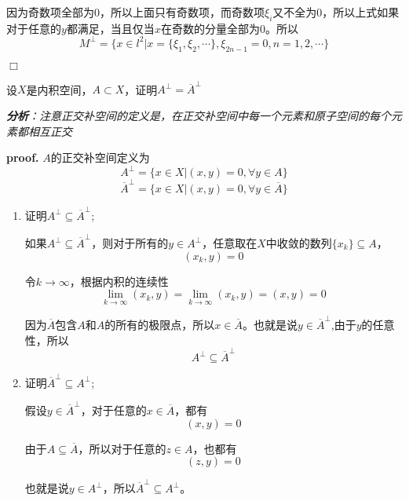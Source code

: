 因为奇数项全部为$0$，所以上面只有奇数项，而奇数项$\xi_i$又不全为$0$，所以上式如果对于任意的$y$都满足，当且仅当$x$在奇数的分量全部为$0$。所以
\begin{equation}
    M^\perp =\{x\in l^2|x=\{\xi_1,\xi_2,\cdots\},\xi_{2n-1}=0,n=1,2,\cdots\}
\end{equation}

$\Box$

\begin{mdframed}
    \begin{question}
        设$X$是内积空间，$A\subset X$，证明$A^\perp=\overline{A}^\perp$
    \end{question}
\end{mdframed}

\textsl{\textbf{分析}：注意正交补空间的定义是，在正交补空间中每一个元素和原子空间的每个元素都相互正交}

\textbf{proof.} $A$的正交补空间定义为
\begin{equation}
    A^\perp=\{x\in X|(x,y)=0,\forall y\in A\}
\end{equation}
\begin{equation}
    \overline{A}^\perp=\{x\in X|(x,y)=0,\forall y\in \overline{A}\}
\end{equation}

\begin{enumerate}[itemindent=2em]
    \item 证明$A^\perp \subseteq \overline{A}^\perp$;

    如果$A^\perp \subseteq \overline{A}^\perp$，则对于所有的$y\in A^\perp$，任意取在$X$中收敛的数列$\{x_k\}\subseteq A$，
    \begin{equation}
        (x_k,y)=0
    \end{equation}

    令$k\rightarrow \infty$，根据内积的连续性
    \begin{equation}
        \lim_{k\rightarrow \infty}(x_k,y)=\lim_{k\rightarrow \infty}(x_k,y)=(x,y)=0
    \end{equation}

    因为$\overline{A}$包含$A$和$A$的所有的极限点，所以$x\in \overline{A}$。也就是说$y\in \overline{A}^\perp$,由于$y$的任意性，所以
    \begin{equation}
        A^\perp\subseteq \overline{A}^\perp
    \end{equation}

    \item 证明$\overline{A}^\perp \subseteq A^\perp$;
    
    假设$y\in \overline{A}^\perp$，对于任意的$x\in \overline{A}$，都有
    \begin{equation}
        (x,y)=0
    \end{equation}

    由于$A\subseteq \overline{A}$，所以对于任意的$z\in A$，也都有
    \begin{equation}
        (z,y)=0
    \end{equation}

    也就是说$y\in A^\perp$，所以$\overline{A}^\perp \subseteq A^\perp$。
\end{enumerate}

